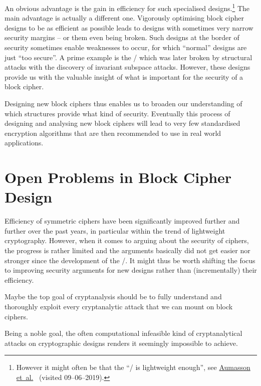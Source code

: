 An obvious advantage is the gain in efficiency for such specialised designs.\footnote{%
    However it might often be that the \enquote{\AES/ is lightweight enough}, see \href{https://blog.teserakt.io/2019/06/03/cryptography-in-industrial-embedded-systems-our-experience-of-the-needs-and-constraints/}{Aumasson et~al.}~ (visited 09--06--2019).
}
The main advantage is actually a different one.
Vigorously optimising block cipher designs to be as efficient as possible leads to designs with sometimes very narrow security margins -- or them even being broken.
Such designs at the border of security sometimes enable weaknesses to occur, for which \enquote{normal} designs are just \enquote{too secure}.
A prime example is the \printcipher/ which was later broken by structural attacks with the discovery of invariant subspace attacks.
However, these designs provide us with the valuable insight of what is important for the security of a block cipher.

Designing new block ciphers thus enables us to broaden our understanding of which structures provide what kind of security.
Eventually this process of designing and analysing new block ciphers will lead to very few standardised encryption algorithms that are then recommended to use in real world applications.

\section{Open Problems in Block Cipher Design}

Efficiency of symmetric ciphers have been significantly improved further and further over the past years, in particular within the trend of lightweight cryptography.
However, when it comes to arguing about the security of ciphers, the progress is rather limited and the arguments basically did not get easier nor stronger since the development of the \AES/.
It might thus be worth shifting the focus to improving security arguments for new designs rather than (incrementally) their efficiency.

Maybe the top goal of cryptanalysis should be to fully understand and thoroughly exploit every cryptanalytic attack that we can mount on block ciphers.

Being a noble goal, the often computational infeasible kind of cryptanalytical attacks on cryptographic designs renders it seemingly impossible to achieve.


